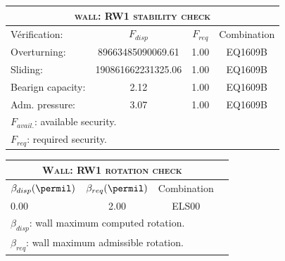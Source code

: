 \begin{center}
\begin{tabular}[H]{|l|c|c|c|}
\hline
\multicolumn{4}{|c|}{\textsc{wall: RW1 stability check}}\\
\hline
Vérification:  & $F_{disp}$ & $F_{req}$ & Combination\\
\hline
Overturning:  & 89663485090069.61 & 1.00 & EQ1609B\\
Sliding:  & 190861662231325.06 & 1.00 & EQ1609B\\
Bearign capacity:  & 2.12 & 1.00 & EQ1609B\\
Adm. pressure:  & 3.07 & 1.00 & EQ1609B\\
\hline
\multicolumn{4}{|l|}{$F_{avail.}$: available security.}\\
\multicolumn{4}{|l|}{$F_{req}$: required security.}\\
\hline
\end{tabular}
\end{center}
\begin{center}
\begin{tabular}[H]{|l|c|c|c|}
\hline
\multicolumn{3}{|c|}{\textsc{Wall: RW1 rotation check}}\\
\hline
$\beta_{disp} (\permil)$ & $\beta_{req}(\permil)$ & Combination\\
\hline
0.00 & 2.00 & ELS00\\
\hline
\multicolumn{3}{|l|}{$\beta_{disp}$: wall maximum computed rotation.}\\
\multicolumn{3}{|l|}{$\beta_{req}$: wall maximum admissible rotation.}\\
\hline
\end{tabular}
\end{center}
 \label{tb_RW1}
\tablelasttail{\hline}
